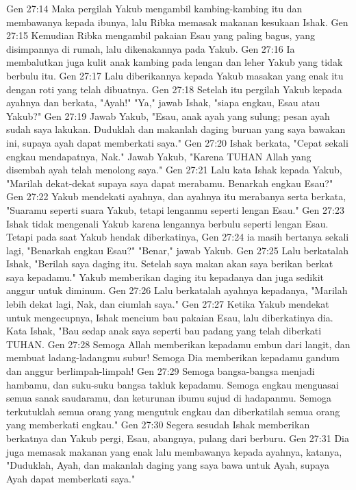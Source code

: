 Gen 27:14  Maka pergilah Yakub mengambil kambing-kambing itu dan membawanya kepada ibunya, lalu Ribka memasak makanan kesukaan Ishak.
Gen 27:15  Kemudian Ribka mengambil pakaian Esau yang paling bagus, yang disimpannya di rumah, lalu dikenakannya pada Yakub.
Gen 27:16  Ia membalutkan juga kulit anak kambing pada lengan dan leher Yakub yang tidak berbulu itu.
Gen 27:17  Lalu diberikannya kepada Yakub masakan yang enak itu dengan roti yang telah dibuatnya.
Gen 27:18  Setelah itu pergilah Yakub kepada ayahnya dan berkata, "Ayah!" "Ya," jawab Ishak, "siapa engkau, Esau atau Yakub?"
Gen 27:19  Jawab Yakub, "Esau, anak ayah yang sulung; pesan ayah sudah saya lakukan. Duduklah dan makanlah daging buruan yang saya bawakan ini, supaya ayah dapat memberkati saya."
Gen 27:20  Ishak berkata, "Cepat sekali engkau mendapatnya, Nak." Jawab Yakub, "Karena TUHAN Allah yang disembah ayah telah menolong saya."
Gen 27:21  Lalu kata Ishak kepada Yakub, "Marilah dekat-dekat supaya saya dapat merabamu. Benarkah engkau Esau?"
Gen 27:22  Yakub mendekati ayahnya, dan ayahnya itu merabanya serta berkata, "Suaramu seperti suara Yakub, tetapi lenganmu seperti lengan Esau."
Gen 27:23  Ishak tidak mengenali Yakub karena lengannya berbulu seperti lengan Esau. Tetapi pada saat Yakub hendak diberkatinya,
Gen 27:24  ia masih bertanya sekali lagi, "Benarkah engkau Esau?" "Benar," jawab Yakub.
Gen 27:25  Lalu berkatalah Ishak, "Berilah saya daging itu. Setelah saya makan akan saya berikan berkat saya kepadamu." Yakub memberikan daging itu kepadanya dan juga sedikit anggur untuk diminum.
Gen 27:26  Lalu berkatalah ayahnya kepadanya, "Marilah lebih dekat lagi, Nak, dan ciumlah saya."
Gen 27:27  Ketika Yakub mendekat untuk mengecupnya, Ishak mencium bau pakaian Esau, lalu diberkatinya dia. Kata Ishak, "Bau sedap anak saya seperti bau padang yang telah diberkati TUHAN.
Gen 27:28  Semoga Allah memberikan kepadamu embun dari langit, dan membuat ladang-ladangmu subur! Semoga Dia memberikan kepadamu gandum dan anggur berlimpah-limpah!
Gen 27:29  Semoga bangsa-bangsa menjadi hambamu, dan suku-suku bangsa takluk kepadamu. Semoga engkau menguasai semua sanak saudaramu, dan keturunan ibumu sujud di hadapanmu. Semoga terkutuklah semua orang yang mengutuk engkau dan diberkatilah semua orang yang memberkati engkau."
Gen 27:30  Segera sesudah Ishak memberikan berkatnya dan Yakub pergi, Esau, abangnya, pulang dari berburu.
Gen 27:31  Dia juga memasak makanan yang enak lalu membawanya kepada ayahnya, katanya, "Duduklah, Ayah, dan makanlah daging yang saya bawa untuk Ayah, supaya Ayah dapat memberkati saya."
